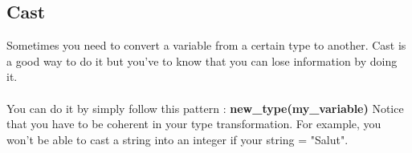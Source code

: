 \documentclass[a4paper, 12pt]{article}
\begin{document}
\subsection{Cast}
Sometimes you need to convert a variable from a certain type to another. Cast is a good way to do it but you've to know that you can lose information by doing it. \\ \\
You can do it by simply follow this pattern : \textbf{new\_type(my\_variable)}
Notice that you have to be coherent in your type transformation. For example, you won't be able to cast a string into an integer if your string = "Salut".
\end{document}
